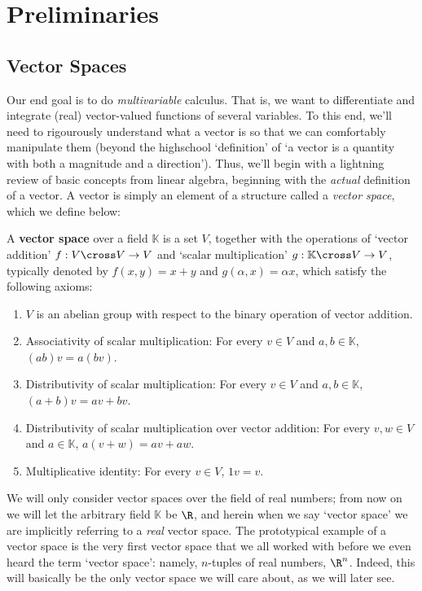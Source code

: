 
\chapter{Preliminaries}
\section{Vector Spaces}
Our end goal is to do \emph{multivariable} calculus. That is, we want to differentiate and integrate (real) vector-valued functions of several variables. To this end, we'll need to rigourously understand what a vector is so that we can comfortably manipulate them (beyond the highschool `definition' of `a vector is a quantity with both a magnitude and a direction'). Thus, we'll begin with a lightning review of basic concepts from linear algebra, beginning with the \emph{actual} definition of a vector. A vector is simply an element of a structure called a \emph{vector space}, which we define below:
\begin{definition}
  A \textbf{vector space} over a field \( \mathbb{K} \) is a set \( V \), together with the operations of `vector addition' \( f:V\cross V\to V \) and `scalar multiplication' \(g:\mathbb{K}\cross V\to V  \), typically denoted by \(f(x,y)=x+y  \) and \( g(\alpha,x)=\alpha x \), which satisfy the following axioms:
  \begin{enumerate}[label=(\alph*)]
  \item \( V \) is an abelian group with respect to the binary operation of vector addition.
  \item Associativity of scalar multiplication: For every \( v\in V \) and \( a,b\in\mathbb{K} \), \( (ab)v=a(bv) \).
  \item Distributivity of scalar multiplication: For every \( v\in V \) and \( a,b\in\mathbb{K} \), \( (a+b)v=av+bv \).
  \item Distributivity of scalar multiplication over vector addition: For every \( v,w\in V \) and \( a\in\mathbb{K} \), \( a(v+w)=av+aw \).
  \item Multiplicative identity: For every \( v\in V \), \( 1v=v \).
  \end{enumerate}
\end{definition}

We will only consider vector spaces over the field of real numbers; from now on we will let the arbitrary field \( \mathbb{K} \) be \( \R \), and herein when we say `vector space' we are implicitly referring to a \emph{real} vector space. The prototypical example of a vector space is the very first vector space that we all worked with before we even heard the term `vector space': namely, \( n \)-tuples of real numbers, \( \R^n \). Indeed, this will basically be the only vector space we will care about, as we will later see.

